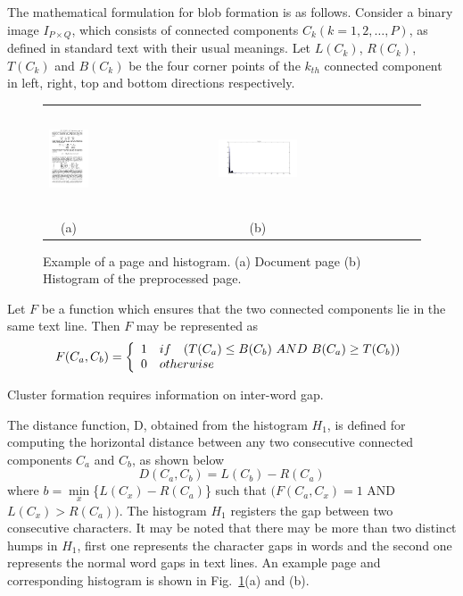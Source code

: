 \documentclass[12pt]{IEEEtran}
\begin{document}
\begin{itemize}
The mathematical formulation for  blob formation is as follows.
Consider a binary image $I_{P \times Q}$, which consists of connected
components $C_k (k=1,2,\ldots ,P)$, as defined in standard text \cite{gonzalez92}
with their usual meanings.
Let $L(C_k)$, $R(C_k)$, $T(C_k)$ and $B(C_k)$
be the four corner  points of the $k_{th}$ connected component in  left, right, top and bottom
directions respectively.

\begin{figure}[h]\center\footnotesize
\begin{tabular}{|c|c|}\hline
 \includegraphics[width=1.0in, height = 1.2in]{page_image.png} &
 \includegraphics[width=0.25\textwidth]{cw_gap.png} \\ 
 (a)  &(b)
 \\\hline
 \end{tabular}
 \caption{Example of a page and histogram. (a) Document page (b) Histogram of the preprocessed page.}
 \label{page_histo}
\end{figure}

Let  $F$ be a function which ensures that the two connected
components lie in the same text line.
Then $F$ may be represented as
{\scriptsize
\[F(C_a,C_b)=\left\{ \begin{array}{llc}
1 & \mbox{if} & (T(C_a)\leq B(C_b)\  AND\  B(C_a)\geq T(C_b)) \\
0  & \multicolumn{2}{l}{\mbox{otherwise}}
\end{array} \right. \]
}

Cluster formation requires information on inter-word gap. 

The  distance function, D, obtained from the histogram $H_1$, is defined for computing the horizontal
distance between any two consecutive connected components $C_a$ and $C_b$, as shown below
\[D(C_a,C_b) = L(C_b) - R(C_a)\]
where $b = \min\limits_x$\{${ L(C_x) - R(C_a)}$\} such that $(F(C_a,C_x) = 1$
AND $L(C_x)>R(C_a))$.
The histogram $H_1$ registers the  gap between
two consecutive characters.
It may be noted that  there may be more than two
distinct humps in $H_1$, first one represents the character gaps in  words and the second one
represents the normal word gaps in  text lines. An example page
and corresponding histogram is shown in
Fig.~\ref{page_histo}(a) and (b).


\end{itemize}
\end{document}
